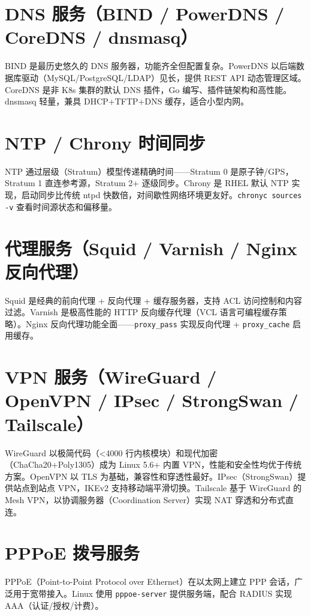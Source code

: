 \documentclass[12pt,UTF8]{ctexbook}
\begin{document}
  \section{DNS 服务（BIND / PowerDNS / CoreDNS / dnsmasq）}

BIND 是最历史悠久的 DNS 服务器，功能齐全但配置复杂。PowerDNS 以后端数据库驱动（MySQL/PostgreSQL/LDAP）见长，提供 REST API 动态管理区域。CoreDNS 是非 K8s 集群的默认 DNS 插件，Go 编写、插件链架构和高性能。dnsmasq 轻量，兼具 DHCP+TFTP+DNS 缓存，适合小型内网。

  \section{NTP / Chrony 时间同步}

NTP 通过层级（Stratum）模型传递精确时间——Stratum 0 是原子钟/GPS，Stratum 1 直连参考源，Stratum 2+ 逐级同步。Chrony 是 RHEL 默认 NTP 实现，启动同步比传统 ntpd 快数倍，对间歇性网络环境更友好。\verb|chronyc sources -v| 查看时间源状态和偏移量。

  \section{代理服务（Squid / Varnish / Nginx 反向代理）}

Squid 是经典的前向代理 + 反向代理 + 缓存服务器，支持 ACL 访问控制和内容过滤。Varnish 是极高性能的 HTTP 反向缓存代理（VCL 语言可编程缓存策略）。Nginx 反向代理功能全面——\verb|proxy_pass| 实现反向代理 + \verb|proxy_cache| 启用缓存。

  \section{VPN 服务（WireGuard / OpenVPN / IPsec / StrongSwan / Tailscale）}

WireGuard 以极简代码（<4000 行内核模块）和现代加密（ChaCha20+Poly1305）成为 Linux 5.6+ 内置 VPN，性能和安全性均优于传统方案。OpenVPN 以 TLS 为基础，兼容性和穿透性最好。IPsec（StrongSwan）提供站点到站点 VPN，IKEv2 支持移动端平滑切换。Tailscale 基于 WireGuard 的 Mesh VPN，以协调服务器（Coordination Server）实现 NAT 穿透和分布式直连。

  \section{PPPoE 拨号服务}

PPPoE（Point-to-Point Protocol over Ethernet）在以太网上建立 PPP 会话，广泛用于宽带接入。Linux 使用 \verb|pppoe-server| 提供服务端，配合 RADIUS 实现 AAA（认证/授权/计费）。
\end{document}
